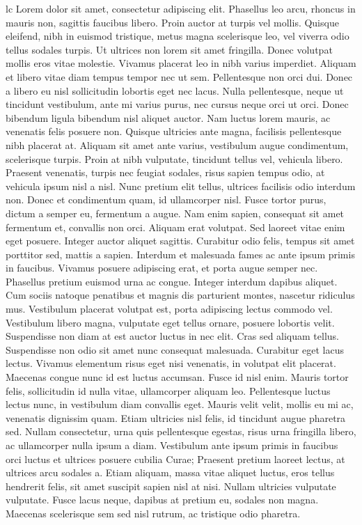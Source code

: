 \documentclass{article}
\begin{document}
lc
\newpage
{}
\beginnumbering
\pstart
Lorem  dolor sit amet, consectetur adipiscing elit. Phasellus leo arcu, rhoncus in mauris non, sagittis faucibus libero. Proin auctor at turpis vel mollis. Quisque eleifend, nibh in euismod tristique, metus magna scelerisque leo, vel viverra odio tellus sodales turpis. Ut ultrices non lorem sit amet fringilla. Donec volutpat mollis eros vitae molestie. Vivamus placerat leo in nibh varius imperdiet. Aliquam et libero vitae diam tempus tempor nec ut sem.
\pend
\pstart
Pellentesque non orci dui. Donec a libero eu nisl sollicitudin lobortis eget nec lacus. Nulla pellentesque, neque ut tincidunt vestibulum, ante mi varius purus, nec cursus neque orci ut orci. Donec bibendum ligula bibendum nisl aliquet auctor. Nam luctus lorem mauris, ac venenatis felis posuere non. Quisque ultricies ante magna, facilisis pellentesque nibh placerat at. Aliquam sit amet ante varius, vestibulum augue condimentum, scelerisque turpis. Proin at nibh vulputate, tincidunt tellus vel, vehicula libero. Praesent venenatis, turpis nec feugiat sodales, risus sapien tempus odio, at vehicula ipsum nisl a nisl. Nunc pretium elit tellus, ultrices facilisis odio interdum non. Donec et condimentum quam, id ullamcorper nisl.
\pend
\pstart
Fusce tortor purus, dictum a semper eu, fermentum a augue. Nam enim sapien, consequat sit amet fermentum et, convallis non orci. Aliquam erat volutpat. Sed laoreet vitae enim eget posuere. Integer auctor aliquet sagittis. Curabitur odio felis, tempus sit amet porttitor sed, mattis a sapien. Interdum et malesuada fames ac ante ipsum primis in faucibus. Vivamus posuere adipiscing erat, et porta augue semper nec.
\pend
\pstart
Phasellus pretium euismod urna ac congue. Integer interdum dapibus aliquet. Cum sociis natoque penatibus et magnis dis parturient montes, nascetur ridiculus mus. Vestibulum placerat volutpat est, porta adipiscing lectus commodo vel. Vestibulum libero magna, vulputate eget tellus ornare, posuere lobortis velit. Suspendisse non diam at est auctor luctus in nec elit. Cras sed aliquam tellus. Suspendisse non odio sit amet nunc consequat malesuada. Curabitur eget lacus lectus. Vivamus elementum risus eget nisi venenatis, in volutpat elit placerat. Maecenas congue nunc id est luctus accumsan. Fusce id nisl enim.
\pend
\pstart
Mauris tortor felis, sollicitudin id nulla vitae, ullamcorper aliquam leo. Pellentesque luctus lectus nunc, in vestibulum diam convallis eget. Mauris velit velit, mollis eu mi ac, venenatis dignissim quam. Etiam ultricies nisl felis, id tincidunt augue pharetra sed. Nullam consectetur, urna quis pellentesque egestas, risus urna fringilla libero, ac ullamcorper nulla ipsum a diam. Vestibulum ante ipsum primis in faucibus orci luctus et ultrices posuere cubilia Curae; Praesent pretium laoreet lectus, at ultrices arcu sodales a. Etiam aliquam, massa vitae aliquet luctus, eros tellus hendrerit felis, sit amet suscipit sapien nisl at nisi. Nullam ultricies vulputate vulputate. Fusce lacus neque, dapibus at pretium eu, sodales non magna. Maecenas scelerisque sem sed nisl rutrum, ac tristique odio pharetra.
\end{document}
